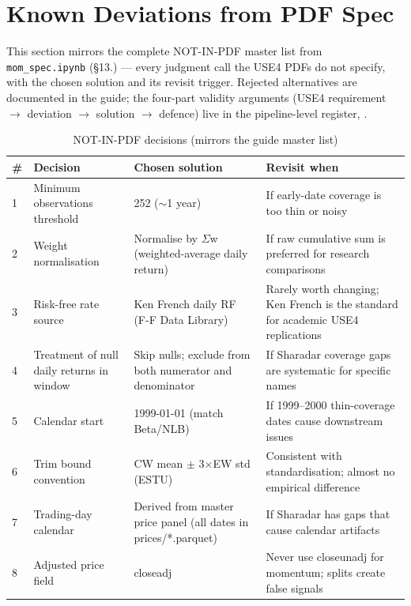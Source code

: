 \documentclass[11pt,a4paper]{article}
\begin{document}
\section{Known Deviations from PDF Spec}

This section mirrors the complete NOT-IN-PDF master list from
\texttt{mom\_spec.ipynb} (\S13.) --- every judgment call the USE4 PDFs do not
specify, with the chosen solution and its revisit trigger. Rejected alternatives
are documented in the guide; the four-part validity arguments (USE4 requirement
$\to$ deviation $\to$ solution $\to$ defence) live in the pipeline-level
register, .

\begin{longtable}{@{}p{0.5cm}p{3.6cm}p{6.0cm}p{3.8cm}@{}}
\caption{NOT-IN-PDF decisions (mirrors the guide master list)}\\
\toprule
\textbf{\#} & \textbf{Decision} & \textbf{Chosen solution} & \textbf{Revisit when} \\
\midrule
\endhead
1 & Minimum observations threshold & 252 ($\sim$1 year) & If early-date coverage is too thin or noisy \\[3pt]
2 & Weight normalisation & Normalise by $\Sigma$w (weighted-average daily return) & If raw cumulative sum is preferred for research comparisons \\[3pt]
3 & Risk-free rate source & Ken French daily RF (F-F Data Library) & Rarely worth changing; Ken French is the standard for academic USE4 replications \\[3pt]
4 & Treatment of null daily returns in window & Skip nulls; exclude from both numerator and denominator & If Sharadar coverage gaps are systematic for specific names \\[3pt]
5 & Calendar start & 1999-01-01 (match Beta/NLB) & If 1999--2000 thin-coverage dates cause downstream issues \\[3pt]
6 & Trim bound convention & CW mean $\pm$ 3$\times$EW std (ESTU) & Consistent with standardisation; almost no empirical difference \\[3pt]
7 & Trading-day calendar & Derived from master price panel (all dates in prices/*.parquet) & If Sharadar has gaps that cause calendar artifacts \\[3pt]
8 & Adjusted price field & closeadj & Never use closeunadj for momentum; splits create false signals \\[3pt]
\bottomrule
\end{longtable}
\end{document}
